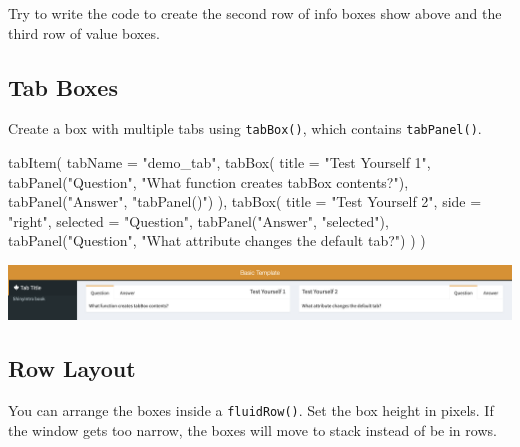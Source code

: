 \documentclass[
]{book}
\newenvironment{Shaded}{\begin{snugshade}}{\end{snugshade}}
\newcommand{\AttributeTok}[1]{\textcolor[rgb]{0.77,0.63,0.00}{#1}}
\newcommand{\FunctionTok}[1]{\textcolor[rgb]{0.00,0.00,0.00}{#1}}
\newcommand{\NormalTok}[1]{#1}
\newcommand{\StringTok}[1]{\textcolor[rgb]{0.31,0.60,0.02}{#1}}
\begin{document}
Try to write the code to create the second row of info boxes show above and the third row of value boxes.

\hypertarget{tab-boxes}{%
\subsection{Tab Boxes}\label{tab-boxes}}

Create a box with multiple tabs using \texttt{tabBox()}, which contains \texttt{tabPanel()}.

\begin{Shaded}
\begin{Highlighting}[]
\FunctionTok{tabItem}\NormalTok{(}
    \AttributeTok{tabName =} \StringTok{"demo\_tab"}\NormalTok{,}
    \FunctionTok{tabBox}\NormalTok{(}
        \AttributeTok{title =} \StringTok{"Test Yourself 1"}\NormalTok{,}
        \FunctionTok{tabPanel}\NormalTok{(}\StringTok{"Question"}\NormalTok{, }\StringTok{"What function creates tabBox contents?"}\NormalTok{),}
        \FunctionTok{tabPanel}\NormalTok{(}\StringTok{"Answer"}\NormalTok{, }\StringTok{"tabPanel()"}\NormalTok{)}
\NormalTok{    ),}
    \FunctionTok{tabBox}\NormalTok{(}
        \AttributeTok{title =} \StringTok{"Test Yourself 2"}\NormalTok{,}
        \AttributeTok{side =} \StringTok{"right"}\NormalTok{,}
        \AttributeTok{selected =} \StringTok{"Question"}\NormalTok{,}
        \FunctionTok{tabPanel}\NormalTok{(}\StringTok{"Answer"}\NormalTok{, }\StringTok{"selected"}\NormalTok{),}
        \FunctionTok{tabPanel}\NormalTok{(}\StringTok{"Question"}\NormalTok{, }\StringTok{"What attribute changes the default tab?"}\NormalTok{)}
\NormalTok{    )}
\NormalTok{)}
\end{Highlighting}
\end{Shaded}

\includegraphics{images/sdb_tab_box.png}

\hypertarget{row-layout}{%
\subsection{Row Layout}\label{row-layout}}

You can arrange the boxes inside a \texttt{fluidRow()}. Set the box height in pixels. If the window gets too narrow, the boxes will move to stack instead of be in rows.
\end{document}
